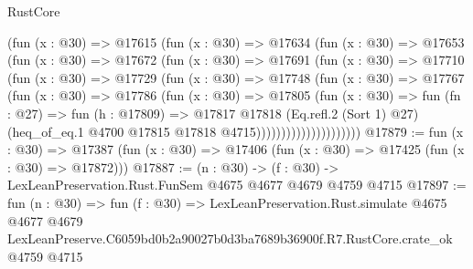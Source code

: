 \begin{lexlean}{RustCore}
\begin{coremodule}
                    (fun (x : @30) =>
                    @17615
                      (fun (x : @30) =>
                      @17634
                        (fun (x : @30) =>
                        @17653
                          (fun (x : @30) =>
                          @17672
                            (fun (x : @30) =>
                            @17691
                              (fun (x : @30) =>
                              @17710
                                (fun (x : @30) =>
                                @17729
                                  (fun (x : @30) =>
                                  @17748
                                    (fun (x : @30) =>
                                    @17767
                                      (fun (x : @30) =>
                                      @17786
                                        (fun (x : @30) =>
                                        @17805
                                          (fun (x : @30) =>
                                          fun (fn : @27) =>
                                          fun (h : @17809) =>
                                          @17817
                                            @17818
                                            (Eq.refl.{2} (Sort 1) @27)
                                            (heq_of_eq.{1}
                                              @4700
                                              @17815
                                              @17818
                                              @4715)))))))))))))))))))))
@17879 := fun (x : @30) =>
  @17387 (fun (x : @30) => @17406 (fun (x : @30) => @17425 (fun (x : @30) => @17872)))
@17887 := (n : @30) -> (f : @30) -> LexLeanPreservation.Rust.FunSem @4675 @4677 @4679 @4759 @4715
@17897 := fun (n : @30) =>
  fun (f : @30) =>
  LexLeanPreservation.Rust.simulate
    @4675
    @4677
    @4679
    LexLeanPreserve.C6059bd0b2a90027b0d3ba7689b36900f.R7.RustCore.crate_ok
    @4759
    @4715
\end{coremodule}
\end{lexlean}
